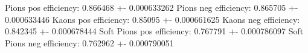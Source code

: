 Pions pos efficiency: 0.866468 +- 0.000633262
Pions neg efficiency: 0.865705 +- 0.000633446
Kaons pos efficiency: 0.85095 +- 0.000661625
Kaons neg efficiency: 0.842345 +- 0.000678444
Soft Pions pos efficiency: 0.767791 +- 0.000786097
Soft Pions neg efficiency: 0.762962 +- 0.000790051
